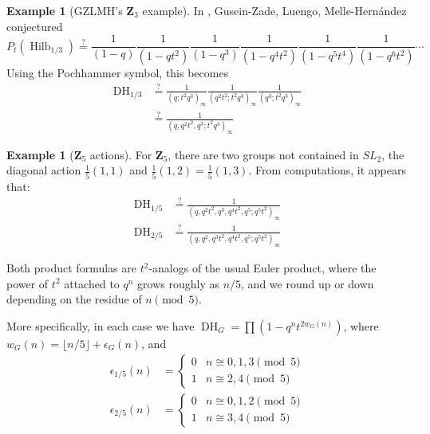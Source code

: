 \documentclass{amsart}[12pt]
\theoremstyle{definition}
\newtheorem{example}[dummy]{Example}
\newcommand{\Z}{\mathbf{Z}}
\DeclareMathOperator{\Hilb}{Hilb}
\DeclareMathOperator{\DC}{DH}
\begin{document}
\begin{example}[GZLMH's $\Z_3$ example]
In \cite{GLM}, Gusein-Zade, Luengo, Melle-Hern\'andez conjectured
$$P_t(\Hilb_{1/3})\stackrel{?}{=}\frac{1}{(1-q)}\frac{1}{(1-qt^2)}\frac{1}{(1-q^3)}\frac{1}{(1-q^4t^2)}\frac{1}{(1-q^5t^4)}\frac{1}{(1-q^6t^2)}\cdots$$
Using the Pochhammer symbol, this becomes
\begin{equation*}
\begin{split}
\DC_{1/3}&\stackrel{?}{=}\frac{1}{(q;t^2q^3)_\infty}\frac{1}{(q^2t^2;t^2q^3)_\infty}\frac{1}{(q^3;t^2q^3)_\infty} \\
&\stackrel{?}{=}\frac{1}{(q,q^2t^2,q^3;t^2q^3)_\infty}
\end{split}
\end{equation*}
\end{example}

\begin{example}[$\Z_5$ actions]
  For $\Z_5$, there are two groups not contained in $SL_2$, the diagonal action $\frac{1}{5}(1,1)$ and $\frac{1}{5}(1,2)=\frac{1}{5}(1,3)$.  From computations, it appears that:
  \begin{align*}
    \DC_{1/5}&\stackrel{?}{=}\frac{1}{(q,q^2t^2,q^3,q^4t^2, q^5; q^5t^2)_\infty} \\
    \DC_{2/5}&\stackrel{?}{=}\frac{1}{(q,q^2,q^3t^2,q^4t^2, q^5; q^5t^2)_\infty}
    \end{align*}

  Both product formulas are $t^2$-analogs of the usual Euler product, where the power of $t^2$ attached to $q^n$ grows roughly as $n/5$, and we round up or down depending on the residue of $n\pmod 5$.

  More specifically, in each case we have $\DC_G=\prod(1-q^nt^{2w_G(n)})$, where $w_G(n)=\lfloor n/5\rfloor + \epsilon_G(n)$, and
\begin{align*}
\epsilon_{1/5}(n)&=\left\{\begin{array}{ll} 0 & n\cong 0,1,3 \pmod 5 \\ 1 & n\cong 2,4 \pmod 5\end{array}\right. \\
\epsilon_{2/5}(n)&=\left\{\begin{array}{ll} 0 & n\cong 0,1,2 \pmod 5 \\ 1 & n\cong 3,4 \pmod 5\end{array}\right.
\end{align*}


\end{example}
\end{document}
